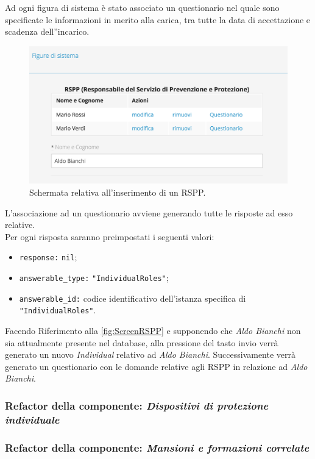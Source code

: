 	Ad ogni figura di sistema è stato associato un questionario nel quale sono specificate le informazioni in merito alla carica, tra tutte la data di accettazione e scadenza dell''incarico.
	\begin{figure}[H]
		\begin{center}
			\includegraphics[width=12cm]{Pics/RemoteTrueRSPP.png}
			\caption{
				Schermata relativa all'inserimento di un RSPP.}
			\label{fig:ScreenRSPP}
		\end{center}
	\end{figure}	
	  L'associazione ad un questionario avviene generando tutte le risposte ad esso relative.\\
	  Per ogni risposta saranno preimpostati i seguenti valori:
	  \begin{itemize}
		  \item \texttt{response:} \texttt{nil};
		  \item \texttt{answerable\_type:} \texttt{"IndividualRoles"};
		  \item \texttt{answerable\_id:} codice identificativo dell'istanza specifica di \texttt{"IndividualRoles"}.
	  \end{itemize}

	Facendo Riferimento alla \autoref{fig:ScreenRSPP} e  supponendo che \textit{Aldo Bianchi} non sia attualmente presente nel database, alla pressione del tasto invio verrà generato un nuovo \textit{Individual} relativo ad \textit{Aldo Bianchi}. Successivamente verrà generato un questionario con le domande relative agli RSPP in relazione ad \textit{Aldo Bianchi}.
	
\newpage
\subsubsection{Refactor della componente: \textit{Dispositivi di protezione individuale}}
\newpage
\subsubsection{Refactor della componente: \textit{Mansioni e formazioni correlate}}
\newpage
